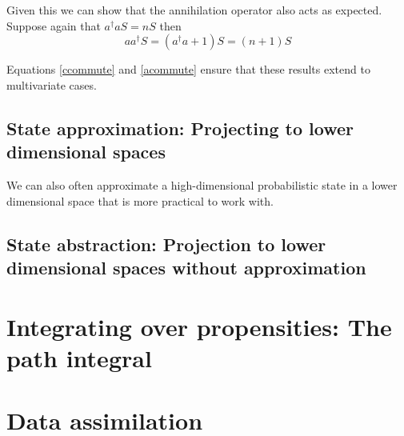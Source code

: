 \documentclass[letterpaper,twocolumn,10pt]{article}
\begin{document}
Given this we can show that the annihilation operator also acts as expected. Suppose again that $a^\dag a S = nS$ then
\[
a a^\dag S = (a^\dag a+1)S = (n+1)S
\]

Equations \ref{ccommute} and \ref{acommute} ensure that these results extend to multivariate cases.

\subsection{State approximation: Projecting to lower dimensional spaces}

We can also often approximate a high-dimensional probabilistic state in a lower dimensional space that is more practical to work with.

\subsection{State abstraction: Projection to lower dimensional spaces without approximation}


\section{Integrating over propensities: The path integral}

\section{Data assimilation}
\end{document}
